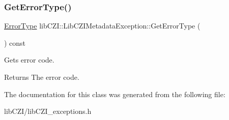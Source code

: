 \subsubsection{\texorpdfstring{Get\+Error\+Type()}{GetErrorType()}}
{\footnotesize\ttfamily \hyperlink{classlib_c_z_i_1_1_lib_c_z_i_metadata_exception_a60fe07e00ad32f331a85aafedec72242}{Error\+Type} lib\+C\+Z\+I\+::\+Lib\+C\+Z\+I\+Metadata\+Exception\+::\+Get\+Error\+Type (\begin{DoxyParamCaption}{ }\end{DoxyParamCaption}) const\hspace{0.3cm}{\ttfamily [inline]}}

Gets error code. \begin{DoxyReturn}{Returns}
The error code. 
\end{DoxyReturn}


The documentation for this class was generated from the following file\+:\begin{DoxyCompactItemize}
\item 
lib\+C\+Z\+I/lib\+C\+Z\+I\+\_\+exceptions.\+h\end{DoxyCompactItemize}
